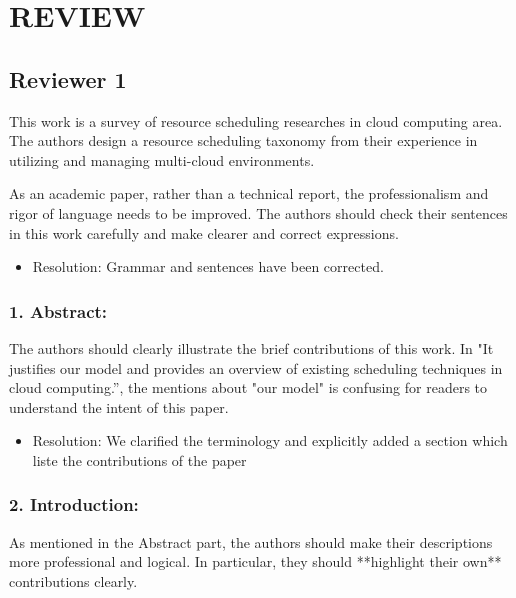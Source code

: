 \section {REVIEW}

\newcommand{\RESOLUTION}[1]{\color{red}\begin{itemize} \item Resolution: #1\end{itemize}\color{black}}

\newcommand{\OK}[1]{\color{blue}\begin{itemize} \item Resolution: #1\end{itemize}\color{black}}


\subsection{Reviewer 1}

This work is a survey of resource scheduling researches in cloud computing area. The authors design a resource scheduling taxonomy from their experience in utilizing and managing multi-cloud environments.


As an academic paper, rather than a technical report, the professionalism and rigor of language needs to be improved. The authors should check their sentences in this work carefully and make clearer and correct expressions.

\OK{Grammar and sentences have been corrected.}

\subsubsection{1. Abstract:}

The authors should clearly illustrate the brief contributions of this work. In "It justifies our model and provides an overview of existing scheduling techniques in cloud computing.”, the mentions about "our model" is confusing for readers to understand the intent of this paper.

\OK{ We clarified the terminology and explicitly added a section which liste the contributions of the paper}


\subsubsection{2. Introduction:}

As mentioned in the Abstract part, the authors should make their descriptions more professional and logical. In particular, they should **highlight their own** contributions clearly.

